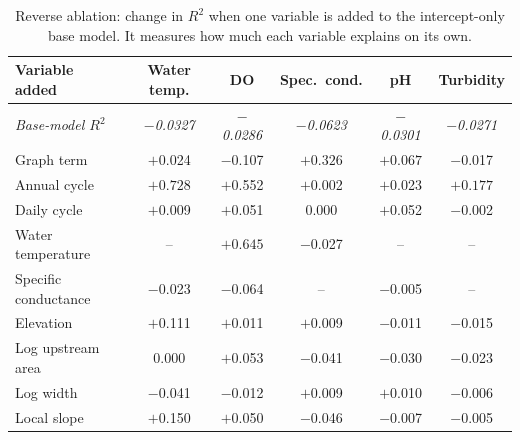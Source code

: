 \documentclass[11pt]{article}
\begin{document}
\begin{table}[h]
\centering
\small
\caption{Reverse ablation: change in $R^2$ when one variable is added to the intercept-only base
model. It measures how much each variable explains on its own.}
\label{tab:reverse}
\begin{tabular}{l c c c c c}
\toprule
Variable added & {Water temp.} & {DO} & {Spec.\ cond.} & {pH} & {Turbidity} \\
\midrule
\emph{Base-model $R^2$} & \emph{$-$0.0327} & \emph{$-$0.0286} & \emph{$-$0.0623} & \emph{$-$0.0301} & \emph{$-$0.0271} \\
\midrule
Graph term           & $+$0.024   & $-$0.107 & $\mathbf{+0.326}$ & $\mathbf{+0.067}$ & $-$0.017 \\
Annual cycle         & $\mathbf{+0.728}$ & $+$0.552 & $+$0.002 & $+$0.023 & $\mathbf{+0.177}$ \\
Daily cycle          & $+$0.009   & $+$0.051 & 0.000    & $+$0.052 & $-$0.002 \\
Water temperature    & --         & $\mathbf{+0.645}$ & $-$0.027 & --       & --       \\
Specific conductance & $-$0.023   & $-$0.064 & --       & $-$0.005 & --       \\
Elevation            & $+$0.111   & $+$0.011 & $+$0.009 & $-$0.011 & $-$0.015 \\
Log upstream area    & 0.000      & $+$0.053 & $-$0.041 & $-$0.030 & $-$0.023 \\
Log width            & $-$0.041   & $-$0.012 & $+$0.009 & $+$0.010 & $-$0.006 \\
Local slope          & $+$0.150   & $+$0.050 & $-$0.046 & $-$0.007 & $-$0.005 \\
\bottomrule
\end{tabular}
\end{table}
\end{document}
